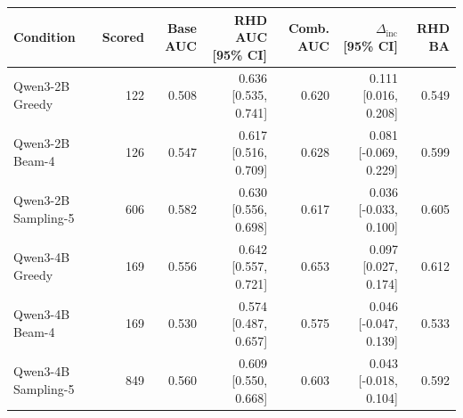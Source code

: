 \begin{tabular}{lrrrrrr}
\toprule
Condition & Scored & Base AUC & RHD AUC [95\% CI] & Comb. AUC & $\Delta_{\mathrm{inc}}$ [95\% CI] & RHD BA \\
\midrule
Qwen3-2B Greedy & 122 & 0.508 & 0.636 [0.535, 0.741] & 0.620 & 0.111 [0.016, 0.208] & 0.549 \\
Qwen3-2B Beam-4 & 126 & 0.547 & 0.617 [0.516, 0.709] & 0.628 & 0.081 [-0.069, 0.229] & 0.599 \\
Qwen3-2B Sampling-5 & 606 & 0.582 & 0.630 [0.556, 0.698] & 0.617 & 0.036 [-0.033, 0.100] & 0.605 \\
Qwen3-4B Greedy & 169 & 0.556 & 0.642 [0.557, 0.721] & 0.653 & 0.097 [0.027, 0.174] & 0.612 \\
Qwen3-4B Beam-4 & 169 & 0.530 & 0.574 [0.487, 0.657] & 0.575 & 0.046 [-0.047, 0.139] & 0.533 \\
Qwen3-4B Sampling-5 & 849 & 0.560 & 0.609 [0.550, 0.668] & 0.603 & 0.043 [-0.018, 0.104] & 0.592 \\
\bottomrule
\end{tabular}
